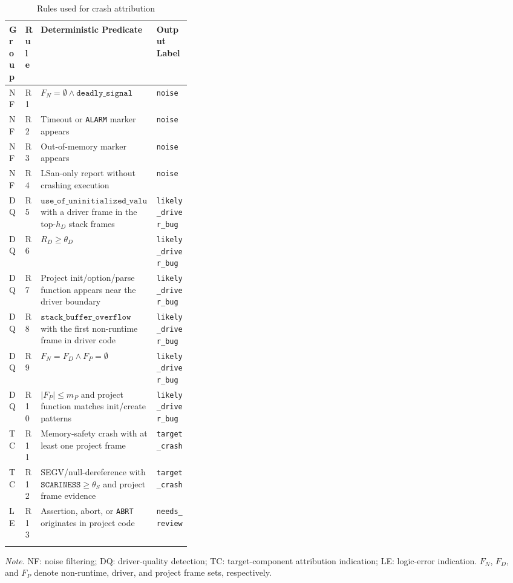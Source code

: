 \documentclass[pdflatex,sn-basic]{sn-jnl}%
\renewcommand{\arraystretch}{1.16}%
\newcommand{\compacttable}{\scriptsize\setlength{\tabcolsep}{2.2pt}\renewcommand{\arraystretch}{1.12}}%
\theoremstyle{thmstyleone}%
\theoremstyle{thmstyletwo}%
\theoremstyle{thmstylethree}%
\begin{document}
\begin{table}[t]
\caption{Rules used for crash attribution}
\label{tab:triage-rule-groups}
\centering
\compacttable
\setlength{\tabcolsep}{2.4pt}
\renewcommand{\arraystretch}{1.10}
\begin{tabularx}{\linewidth}{C{0.08\linewidth} C{0.08\linewidth} Y L{0.19\linewidth}}
\toprule
\textbf{Group} & \textbf{Rule} & \textbf{Deterministic Predicate} & \textbf{Output Label} \\
\midrule
NF & R1 & \(F_N=\emptyset \land \texttt{deadly\_signal}\) & \texttt{noise} \\
NF & R2 & Timeout or \texttt{ALARM} marker appears & \texttt{noise} \\
NF & R3 & Out-of-memory marker appears & \texttt{noise} \\
NF & R4 & LSan-only report without crashing execution & \texttt{noise} \\
\midrule
DQ & R5 & \(\texttt{use\_of\_uninitialized\_value}\) with a driver frame in the top-\(h_D\) stack frames & \texttt{likely\_driver\_bug} \\
DQ & R6 & \(R_D\ge \theta_D\) & \texttt{likely\_driver\_bug} \\
DQ & R7 & Project init/option/parse function appears near the driver boundary & \texttt{likely\_driver\_bug} \\
DQ & R8 & \(\texttt{stack\_buffer\_overflow}\) with the first non-runtime frame in driver code & \texttt{likely\_driver\_bug} \\
DQ & R9 & \(F_N=F_D \land F_P=\emptyset\) & \texttt{likely\_driver\_bug} \\
DQ & R10 & \(|F_P|\le m_P\) and project function matches init/create patterns & \texttt{likely\_driver\_bug} \\
\midrule
TC & R11 & Memory-safety crash with at least one project frame & \texttt{target\_crash} \\
TC & R12 & SEGV/null-dereference with \(\texttt{SCARINESS}\ge \theta_S\) and project frame evidence & \texttt{target\_crash} \\
\midrule
LE & R13 & Assertion, abort, or \texttt{ABRT} originates in project code & \texttt{needs\_review} \\
\botrule
\end{tabularx}
\vspace{2pt}
{\raggedright\scriptsize \textit{Note.} NF: noise filtering; DQ: driver-quality detection; TC: target-component attribution indication; LE: logic-error indication. \(F_N\), \(F_D\), and \(F_P\) denote non-runtime, driver, and project frame sets, respectively.\par}
\end{table}
\end{document}
